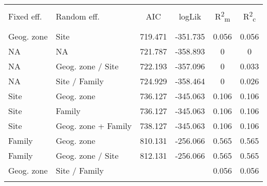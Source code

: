 
\begin{table}[!htbp] \centering 
  \caption{} 
  \label{lmer_comp} 
\begin{tabular}{@{\extracolsep{5pt}} llS[table-format=3.2]S[table-format=3.2]S[table-format=3.2]S[table-format=3.2]} 
\\[-1.8ex]\hline 
\hline \\[-1.8ex] 
{Fixed eff.} & {Random eff.} & {AIC} & {logLik} & {R\textsuperscript{2}\textsubscript{m}} & {R\textsuperscript{2}\textsubscript{c}} \\
\hline \\[-1.8ex] 
Geog. zone & Site & 719.471 & -351.735 & 0.056 & 0.056 \\ 
NA & NA & 721.787 & -358.893 & 0 & 0 \\ 
NA & Geog. zone / Site & 722.193 & -357.096 & 0 & 0.033 \\ 
NA & Site / Family & 724.929 & -358.464 & 0 & 0.026 \\ 
Site & Geog. zone & 736.127 & -345.063 & 0.106 & 0.106 \\ 
Site & Family & 736.127 & -345.063 & 0.106 & 0.106 \\ 
Site & Geog. zone + Family & 738.127 & -345.063 & 0.106 & 0.106 \\ 
Family & Geog. zone & 810.131 & -256.066 & 0.565 & 0.565 \\ 
Family & Geog. zone / Site & 812.131 & -256.066 & 0.565 & 0.565 \\ 
Geog. zone & Site / Family &  &  & 0.056 & 0.056 \\ 
\hline \\[-1.8ex] 
\end{tabular} 
\end{table} 
